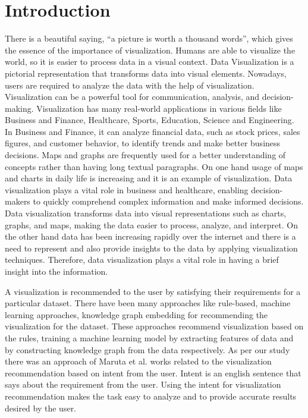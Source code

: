 \chapter{Introduction}

There is a beautiful saying, ``a picture is worth a thousand words'', which gives the essence of the importance of visualization. Humans are able to visualize the world, so it is easier to process data in a visual context. Data Visualization is a pictorial representation that transforms data into visual elements. Nowadays, users are required to analyze the data with the help of visualization. Visualization can be a powerful tool for communication, analysis, and decision-making. Visualization has many real-world applications in various fields like Business and Finance, Healthcare, Sports, Education, Science and Engineering. In Business and Finance, it can analyze financial data, such as stock prices, sales figures, and customer behavior, to identify trends and make better business decisions. Maps and graphs are frequently used for a better understanding of concepts rather than having long textual paragraphs. On one hand usage of maps and charts in daily life is increasing and it is an example of visualization. Data visualization plays a vital role in business and healthcare, enabling decision-makers to quickly comprehend complex information and make informed decisions. Data visualization transforms data into visual representations such as charts, graphs, and maps, making the data easier to process, analyze, and interpret. On the other hand data has been increasing rapidly over the internet and there is a need to represent and also provide insights to the data by applying visualization techniques. Therefore, data visualization plays a vital role in having a brief insight into the information.

A visualization is recommended to the user by satisfying their requirements for a particular dataset. There have been many approaches like rule-based, machine learning approaches, knowledge graph embedding  for recommending the visualization for the dataset. These approaches recommend visualization based on the rules, training a machine learning model by extracting features of data and by constructing knowledge graph from the data respectively. As per our study there was an approach of Maruta et al. \cite{maruta2021intent} works related to the visualization recommendation based on intent from the user. Intent is an english sentence that says about the requirement from the user. Using the intent for visualization recommendation makes the task easy to analyze and to provide accurate results desired by the user. 

